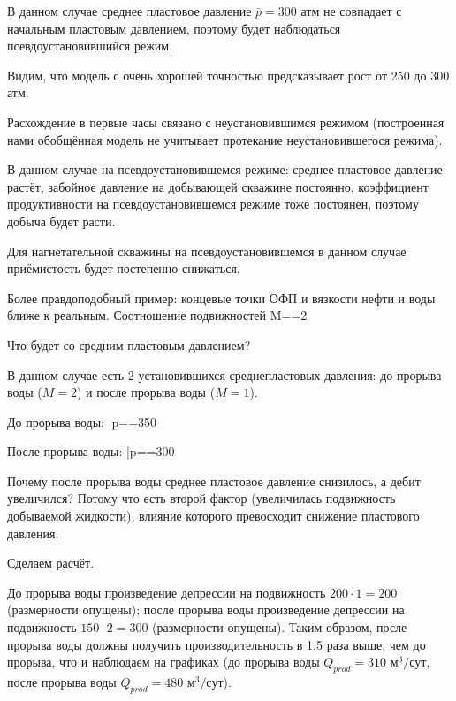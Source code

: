 \documentclass[main.tex]{subfiles}
\begin{document}

В данном случае среднее пластовое давление $\bar{p}=300\text{ атм}$ не совпадает с начальным пластовым давлением, поэтому будет наблюдаться псевдоустановившийся режим.

Видим, что модель с очень хорошей точностью предсказывает рост от 250 до 300 атм.


Расхождение в первые часы связано с неустановившимся режимом (построенная нами обобщённая модель не учитывает протекание неустановившегося режима).

В данном случае на псевдоустановившемся режиме: среднее пластовое давление растёт, забойное давление на добывающей скважине постоянно, коэффициент продуктивности на псевдоустановившемся режиме тоже постоянен, поэтому добыча будет расти.


Для нагнетательной скважины на псевдоустановившемся в данном случае приёмистость будет постепенно снижаться.


Более правдоподобный пример: концевые точки ОФП и вязкости нефти и воды ближе к реальным. Соотношение подвижностей
\beq
M==2
\eeq

Что будет со средним пластовым давлением?

В данном случае есть 2 установившихся среднепластовых давления: до прорыва воды ($M=2$) и после прорыва воды ($M=1$).

До прорыва воды:
\beq
\bar{p}==350
\eeq

После прорыва воды:
\beq
\bar{p}==300
\eeq

Почему после прорыва воды среднее пластовое давление снизилось, а дебит увеличился? Потому что есть второй фактор (увеличилась подвижность добываемой жидкости), влияние которого превосходит снижение пластового давления.

Сделаем расчёт.

До прорыва воды произведение депрессии на подвижность $200\cdot1=200$ (размерности опущены); после прорыва воды произведение депрессии на подвижность $150\cdot2=300$ (размерности опущены). Таким образом, после прорыва воды должны получить производительность в 1.5 раза выше, чем до прорыва, что и наблюдаем на графиках (до прорыва воды $Q_{prod}=310\text{ м}^3\text{/сут}$, после прорыва воды $Q_{prod}=480\text{ м}^3\text{/сут}$).
\end{document}
